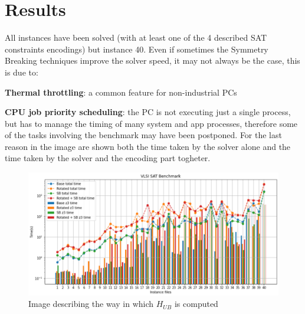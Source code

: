 \section{Results}
All instances have been solved (with at least one of the 4 described SAT constraints encodings) but instance 40. Even if sometimes the Symmetry Breaking techniques improve the solver speed, it may not always be the case, this is due to:
\itemize
	\item \textbf{Thermal throttling}: a common feature for non-industrial PCs
	\item \textbf{CPU job priority scheduling}: the PC is not executing just a single process, but has to manage the timing of many system and app processes, therefore some of the tasks involving the benchmark may have been postponed.
For the last reason in the image are shown both the time taken by the solver alone and the time taken by the solver and the encoding part togheter.
\begin{figure}[H]
  \centering
  \includegraphics[scale=0.9]{figures/sat_benchmark.png}
  \caption{Image describing the way in which $H_{UB}$ is computed}
  \label{img:H_sat_bench}
\end{figure}
